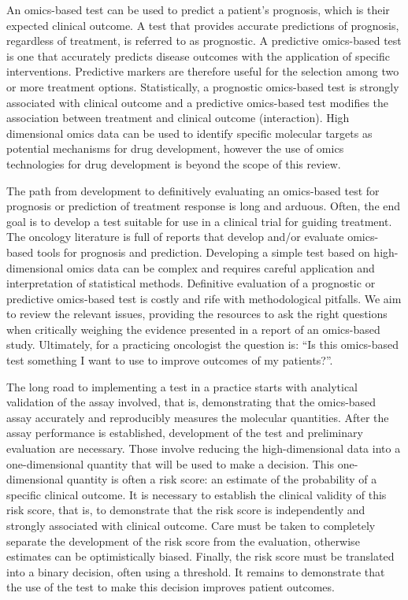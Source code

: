 \documentclass[11pt]{article}
\begin{document}
An omics-based test can be used to predict a patient's prognosis, which
is their expected clinical outcome. A test that provides accurate
predictions of prognosis, regardless of treatment, is referred to as
prognostic. A predictive omics-based test is one that accurately
predicts disease outcomes with the application of specific
interventions. Predictive markers are therefore useful for the selection
among two or more treatment options. Statistically, a prognostic
omics-based test is strongly associated with clinical outcome and a
predictive omics-based test modifies the association between treatment
and clinical outcome (interaction). High dimensional omics data can be
used to identify specific molecular targets as potential mechanisms for
drug development, however the use of omics technologies for drug
development is beyond the scope of this review.

The path from development to definitively evaluating an omics-based test
for prognosis or prediction of treatment response is long and arduous.
Often, the end goal is to develop a test suitable for use in a clinical
trial for guiding treatment. The oncology literature is full of reports
that develop and/or evaluate omics-based tools for prognosis and
prediction. Developing a simple test based on high-dimensional omics
data can be complex and requires careful application and interpretation
of statistical methods. Definitive evaluation of a prognostic or
predictive omics-based test is costly and rife with methodological
pitfalls. We aim to review the relevant issues, providing the resources
to ask the right questions when critically weighing the evidence
presented in a report of an omics-based study. Ultimately, for a
practicing oncologist the question is: ``Is this omics-based test
something I want to use to improve outcomes of my patients?''.

The long road to implementing a test in a practice starts with
analytical validation of the assay involved, that is, demonstrating that
the omics-based assay accurately and reproducibly measures the molecular
quantities. After the assay performance is established, development of
the test and preliminary evaluation are necessary. Those involve
reducing the high-dimensional data into a one-dimensional quantity that
will be used to make a decision. This one-dimensional quantity is often
a risk score: an estimate of the probability of a specific clinical
outcome. It is necessary to establish the clinical validity of this risk
score, that is, to demonstrate that the risk score is independently and
strongly associated with clinical outcome. Care must be taken to
completely separate the development of the risk score from the
evaluation, otherwise estimates can be optimistically biased. Finally,
the risk score must be translated into a binary decision, often using a
threshold. It remains to demonstrate that the use of the test to make
this decision improves patient outcomes.
\end{document}
